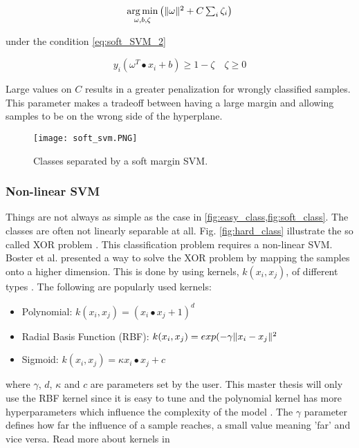 \begin{equation} \label{eq:soft_SVM}
\underset{\omega,b,\zeta}{\mathrm{\operatorname{arg\,min}}} 
\begin{pmatrix}
\lVert\omega\rVert^2 + C\sum_{i}\zeta_i
\end{pmatrix}
\end{equation} 

under the condition \cref{eq:soft_SVM_2}

\begin{equation} \label{eq:soft_SVM_2}
y_i(\omega^T \bullet x_i + b) \geq 1 - \zeta \quad \zeta \geq 0
\end{equation} 

Large values on $C$ results in a greater penalization for wrongly classified samples. This parameter makes a tradeoff between having a large margin and allowing samples to be on the wrong side of the hyperplane.    

\FloatBarrier
\begin{figure}[!h]
	\centering
	\texttt{[image: soft\_svm.PNG]}
	\caption{Classes separated by a soft margin SVM.
		\label{fig:soft_class}}
\end{figure} 
\FloatBarrier

\subsubsection{Non-linear SVM}

Things are not always as simple as the case in \cref{fig:easy_class,fig:soft_class}. The classes are often not linearly separable at all. Fig. \ref{fig:hard_class} illustrate the so called XOR problem \cite{yu2012svm}. This classification problem requires a non-linear SVM. Boster et al. \cite{boser1992training} presented a way to solve the XOR problem by mapping the samples onto a higher dimension. This is done by using kernels, $k(x_i,x_j)$, of different types \cite{yu2012svm}. The following are popularly used kernels: 

\begin{itemize}
	\item Polynomial: $k(x_i,x_j) =(x_i \bullet  x_j + 1)^d $
	\item Radial Basis Function (RBF): $k(x_i,x_j) = exp(-\gamma \lVert x_i - x_j\rVert^2 $
	\item Sigmoid: $k(x_i,x_j) =\kappa x_i \bullet  x_j + c$
\end{itemize}

where $\gamma$, $d$, $\kappa$ and $c$ are parameters set by the user. This master thesis will only use the RBF kernel since it is easy to tune and the polynomial kernel has more hyperparameters which influence the complexity of the model \cite{svm_guide}. The $\gamma$ parameter defines how far the influence of a sample reaches, a small value meaning 'far' and vice versa. Read more about kernels in \cite{vert2004primer} 

